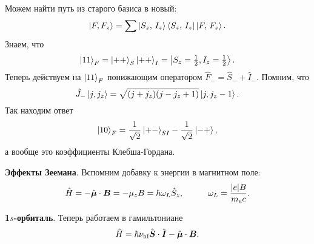 Можем найти путь из старого базиса в новый:
\begin{equation*}
    \left| F,F_z \right\rangle = \sum \left| S_z,\, I_z \right\rangle \left\langle S_z,\, I_z \right| \left| F,\, F_z \right\rangle.
\end{equation*}
Знаем, что
\begin{equation*}
    \left| 11 \right\rangle_F = \left| ++ \right\rangle_S \left| ++ \right\rangle_I = \left| S_z=\tfrac{1}{2}, I_z = \tfrac{1}{2} \right\rangle.
\end{equation*}
Теперь действуем на $\left| 11 \right\rangle_F$ понижающим оператором $\hat{F}_- = \hat{S}_- + \hat{I}_-$. Помним, что
\begin{equation*}
    \hat{J}_- \left| j, j_z \right\rangle = \sqrt{(j+j_z)(j-j_z+1)} \left| j, j_z-1 \right\rangle.
\end{equation*}
Так находим ответ
\begin{equation*}
    \left| 10 \right\rangle_F = \frac{1}{\sqrt{2}} \left| +- \right\rangle_{SI} - \frac{1}{\sqrt{2}} \left| -+ \right\rangle,
\end{equation*}
а вообще это коэффициенты Клебша-Гордана.

\textbf{Эффекты Зеемана}. Вспомним добавку к энергии в магнитном поле:
\begin{equation*}
    \hat{H} = - \hat{\vc{\mu}} \cdot \vc{B} = - \mu_z B = \hbar \omega_L \hat{S}_z,
    \hspace{10 mm} 
    \omega_L = \frac{|e| B}{m_e c}.
\end{equation*}


\textbf{1$s$-орбиталь}. Теперь работаем в гамильтониане
\begin{equation*}
    \hat{H} = \hbar \nu_{\textnormal{hf}} \hat{\mbox{\boldmath $S$}} \cdot \hat{\mbox{\boldmath $I$}} - \hat{\mbox{\boldmath $\mu$}} \cdot  \mbox{\boldmath $B$}.
\end{equation*}


